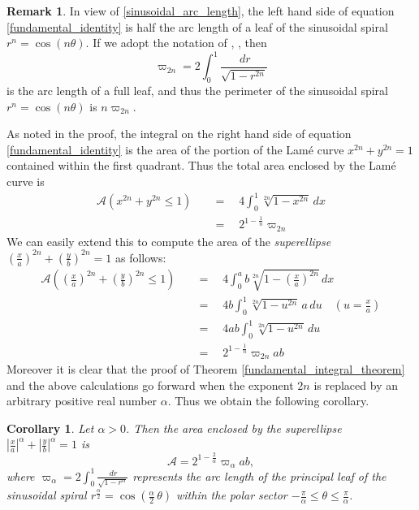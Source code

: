 \documentclass{amsart}
\newtheorem{corollary}[theorem]{Corollary}
\theoremstyle{definition}
\newtheorem{remark}[theorem]{Remark}
\newcommand{\calA}{\mathcal{A}}
\begin{document}
\bigskip

\begin{remark}
In view of \eqref{sinusoidal_arc_length}, the left hand side of equation \eqref{fundamental_identity} is half the
arc length of a leaf of the sinusoidal spiral $r^n=\cos(n\theta)$. If we adopt the notation of \cite{thyde}, \cite{cox}, then
\begin{equation}
\varpi_{2n}=2\int_0^1\frac{\,dr}{\sqrt{1-r^{2n}}}
\end{equation}
is the arc length of a full leaf, and thus the perimeter of the sinusoidal spiral $r^n=\cos(n\theta)$ is $n\varpi_{2n}$.

As noted in the proof, the integral on the right hand side of equation \eqref{fundamental_identity} is  the area of the portion of
the Lam\'e curve $x^{2n}+y^{2n}=1$ contained within the first quadrant. Thus the total area enclosed by the
Lam\'e curve is
\begin{align}
\calA\left(x^{2n}+y^{2n}\le1\right) &\quad=\quad 4\int_0^1\sqrt[2n]{1-x^{2n}}\,dx\nonumber\\
&\quad=\quad 2^{1-\frac{1}{n}}\varpi_{2n}
\end{align}
We can easily extend this to compute the area of the \textit{superellipse} \cite{Wikipedia:superellipse}
${\left(\frac{x}{a}\right)^{2n}+\left(\frac{y}{b}\right)^{2n}=1}$ as follows:
\begin{align}
\calA\left(\left(\frac{x}{a}\right)^{2n}+\left(\frac{y}{b}\right)^{2n}\le1\right)
&\quad=\quad 4\int_0^a b\sqrt[2n]{1-\left(\frac{x}{a}\right)^{2n}}\,dx\nonumber\\
&\quad=\quad 4b\int_0^1 \sqrt[2n]{1-u^{2n}}\,a\,du\quad\left(u=\frac{x}{a}\right)\nonumber\\
&\quad=\quad 4ab\int_0^1 \sqrt[2n]{1-u^{2n}}\,du\quad\nonumber\\
&\quad=\quad 2^{1-\frac{1}{n}}\varpi_{2n}ab
\end{align}
Moreover it is clear that the proof of Theorem \ref{fundamental_integral_theorem} and the above calculations go
forward when the exponent $2n$ is replaced by an arbitrary positive real number $\alpha$. Thus we obtain the
following corollary.
\end{remark}

\bigskip

\begin{corollary}
Let $\alpha>0$. Then the area enclosed by the superellipse 
${\left|\frac{x}{a}\right|^{\alpha}+\left|\frac{y}{b}\right|^{\alpha}=1}$ is
\begin{equation}
\calA=2^{1-\frac{2}{\alpha}}\varpi_{\alpha}ab,
\end{equation}
where ${\varpi_{\alpha}=2\int_0^1\frac{\,dr}{\sqrt{1-r^{\alpha}}}}$ represents the arc length of the principal leaf of the sinusoidal
spiral ${r^{\frac{\alpha}{2}}=\cos\left(\frac{\alpha}{2}\,\theta\right)}$ within the polar sector 
${-\frac{\pi}{\alpha}\le\theta\le\frac{\pi}{\alpha}}$.
\end{corollary}
\end{document}
